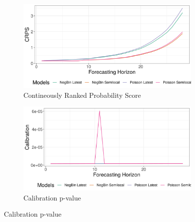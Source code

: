 \begin{figure}[H]
\begin{subfigure}{0.5\textwidth}
  \centering
  \includegraphics[width=\linewidth]{../output/Oicha_crps.png}  
  \caption{Contineously Ranked Probability Score}
  \label{fig:sub-first}
\end{subfigure}
\begin{subfigure}{0.5\textwidth}
  \centering
  \includegraphics[width=\linewidth]{../output/Oicha_calibration.png}  
  \caption{Calibration p-value}
  \label{fig:sub-second}
\end{subfigure}


\end{figure}
